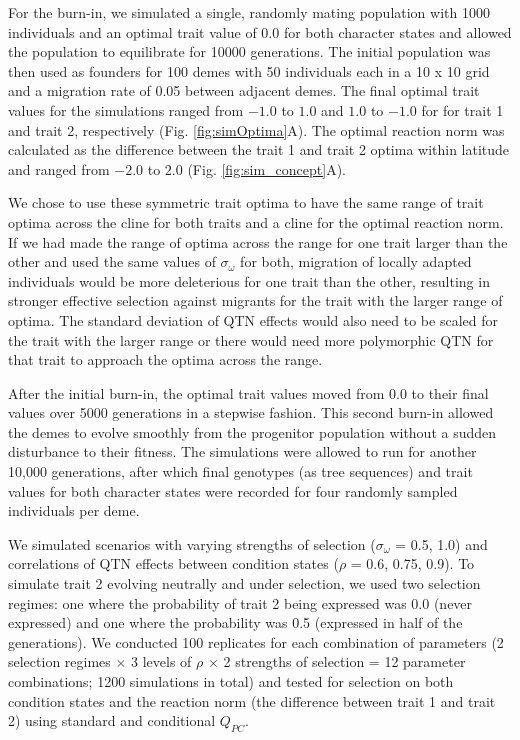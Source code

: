 \documentclass[11pt,letterpaper]{article}
\newcommand{\qpc}{$Q_{PC}$}
\begin{document}
For the burn-in, we simulated a single, randomly mating population with 1000 individuals and an optimal trait value of 0.0 for both character states and allowed the population to equilibrate for 10000 generations. The initial population was then used as founders for 100 demes with 50 individuals each in a 10 x 10 grid and a migration rate of 0.05 between adjacent demes. The final optimal trait values for the simulations ranged from $-1.0$ to $1.0$ and $1.0$ to $-1.0$ for for trait 1 and trait 2, respectively (Fig. \ref{fig:simOptima}A). The optimal reaction norm was calculated as the difference between the trait 1 and trait 2 optima within latitude and ranged from $-2.0$ to $2.0$ (Fig. \ref{fig:sim_concept}A). 

We chose to use these symmetric trait optima to have the same range of trait optima across the cline for both traits and a cline for the optimal reaction norm. If we had made the range of optima across the range for one trait larger than the other and used the same values of $\sigma_\omega$ for both, migration of locally adapted individuals would be more deleterious for one trait than the other, resulting in stronger effective selection against migrants for the trait with the larger range of optima. The standard deviation of QTN effects would also need to be scaled for the trait with the larger range or there would need more polymorphic QTN for that trait to approach the optima across the range. 

After the initial burn-in, the optimal trait values moved from $0.0$ to their final values over 5000 generations in a stepwise fashion. This second burn-in allowed the demes to evolve smoothly from the progenitor population without a sudden disturbance to their fitness. 
The simulations were allowed to run for another 10,000 generations, after which final genotypes (as tree sequences) and trait values for both character states were recorded for four randomly sampled individuals per deme.

We simulated scenarios with varying strengths of selection ($\sigma_\omega$ = 0.5, 1.0) and correlations of QTN effects between condition states ($\rho$ = 0.6, 0.75, 0.9). To simulate trait 2 evolving neutrally and under selection, we used two selection regimes: one where the probability of trait 2 being expressed was 0.0 (never expressed) and one where the probability was 0.5 (expressed in half of the generations). We conducted 100 replicates for each combination of parameters (2 selection regimes $\times$ 3 levels of $\rho$ $\times$ 2 strengths of selection = 12 parameter combinations; 1200 simulations in total) and tested for selection on both condition states and the reaction norm (the difference between trait 1 and trait 2) using standard and conditional \qpc.
\end{document}
